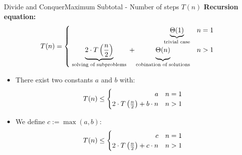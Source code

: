 

\begin{frame}{Divide and Conquer}{Maximum Subtotal - Number of steps $T(n)$}
  \textbf{Recursion equation:} 
  \begin{displaymath}
    T(n) = \begin{cases}
      \hfill \underbrace{\Theta(1)}_\text{trivial case} & n = 1\\
      \underbrace{2 \cdot T\left(\frac{n}{2}\right)}_\text{
        solving of subproblems
      } + \underbrace{
        \Theta(n)
        \vphantom{\left(\frac{n}{2}\right)}
      }_\text{cobination of solutions} & n > 1
    \end{cases}
  \end{displaymath}
    \begin{itemize}
    \item<2->
      There exist two constants $a$ and $b$ with:
      \begin{displaymath}
        T(n) \leq \begin{cases}
          \hfill a & n = 1\\
          2 \cdot T\left(\frac{n}{2}\right) + b \cdot n & n > 1
        \end{cases}
      \end{displaymath}
    \item<3->
      We define $c := \max(a,b)$:
      \begin{displaymath}
        T(n) \leq \begin{cases}
          \hfill c & n = 1\\
          2 \cdot T\left(\frac{n}{2}\right) + c \cdot n & n > 1
        \end{cases}
      \end{displaymath}
  \end{itemize}
\end{frame}


